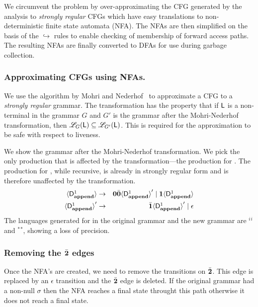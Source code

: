 \documentclass[9pt]{sigplanconf}
\newcommand{\comment}[1]{{\color{Myblue}{(#1)}}}
\begin{document}
\begin{enumerate}
  We circumvent the problem by over-approximating the CFG generated by the analysis to  {\em
  strongly  regular}  CFGs which  have   easy
translations to non-deterministic finite state automata (NFA). The
NFAs are then simplified on the
basis  of  the  $\hookrightarrow$  rules to  enable  checking  of
membership of forward access paths. The resulting NFAs are   finally
converted to DFAs for use during garbage collection.
\comment{Fix all comments and produce first draft}
\subsubsection{Approximating CFGs using NFAs.}
\label{sec:NFA-approx}
\comment{Change the language and the example}
We use the   
algorithm  by  Mohri  and Nederhof~\cite{mohri00regular}   to
approximate a CFG  to a   {\em strongly regular\/} grammar.  The
transformation has  the  property that  if $\mathsf{L}$  is a
non-terminal  in the grammar  $G$ and  $G'$ is  the grammar  after the
Mohri-Nederhof transformation, then  ${\mathscr L}_G(\mathsf{L}) \subseteq {\mathscr
  L}_{G'}(\mathsf{L})$.    This  is   required  for the
approximation to be safe with respect to liveness.

We show the  grammar after the Mohri-Nederhof
transformation. We  pick the only production that  is affected by
the transformation---the production for .  The
production for , while  recursive, is already in
strongly  regular  form  and   is  therefore  unaffected  by  the
transformation.
 \begin{eqnarray*}
  \var{\Df{\append}{1}}
  &\rightarrow&               \acar\bcar \var{\Df{\append}{1}}'  \mid
  \acdr\var{\Df{\append}{1}} \\ 
\var{\Df{\append}{1}}'  &\rightarrow&   \bcdr\var{\Df{\append}{1}}'
\mid \epsilon 
\end{eqnarray*}
The  languages
generated for   in  the original grammar  and the
new       grammar      are       \acdr$^i$\acar\bcar\bcdr$^i$      and
\acdr$^*$\acar\bcar\bcdr$^*$, showing a  loss of  precision.
 
\subsubsection{Removing the $\bar{\mathbf{2}}$ edges}
Once the NFA's are created, we need to remove the transitions on 
$\bar{\mathbf{2}}$. This edge is replaced by an $\epsilon$ transition and the 
$\bar{\mathbf{2}}$ edge is deleted. If the original grammar had a non-null 
$\sigma$ then the NFA reaches a final state throught this path 
otherwise it does not reach a final state.\comment{Need to rewrite this}

\end{enumerate}
\end{document}
